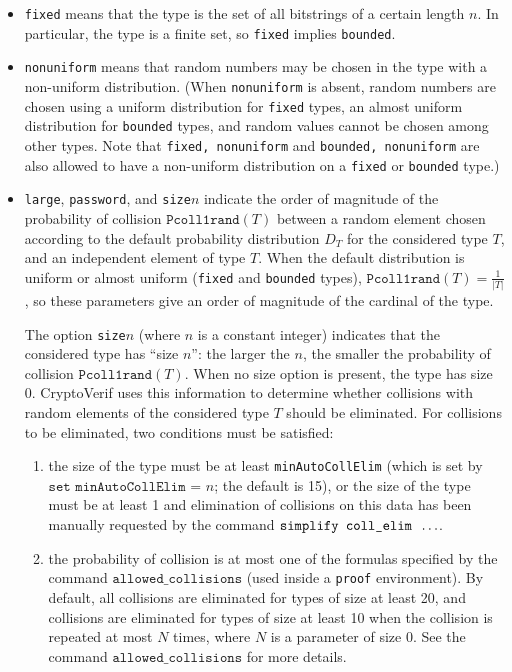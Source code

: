 \begin{itemize}
\begin{itemize}
\item \texttt{fixed} means that the type is the set of all bitstrings of 
a certain length $n$. In particular, the type is a finite set,
so \texttt{fixed} implies \texttt{bounded}. 

\item \texttt{nonuniform} means that random numbers may be chosen in
  the type with a non-uniform distribution. (When \texttt{nonuniform}
  is absent, random numbers are chosen using a uniform distribution
  for {\tt fixed} types, an almost uniform distribution for
  \texttt{bounded} types, and random values cannot be chosen among
  other types. Note that \texttt{fixed, nonuniform} and
  \texttt{bounded, nonuniform} are also allowed to have a non-uniform
  distribution on a \texttt{fixed} or \texttt{bounded} type.)

\item \texttt{large}, \texttt{password}, and \texttt{size$n$} indicate 
the order of magnitude of the probability of collision $\texttt{Pcoll1rand}(T)$
between a random element
chosen according to the default probability distribution $D_T$ for the considered type $T$,
and an independent element of type $T$. When the default distribution is uniform
or almost uniform ({\tt fixed} and {\tt bounded} types), $\texttt{Pcoll1rand}(T) = \frac{1}{|T|}$,
so these parameters give an order of magnitude of the cardinal of the type.

The option \texttt{size$n$} (where $n$ is a constant integer) indicates
that the considered type has ``size $n$'': the larger the $n$, the
smaller the probability of collision $\texttt{Pcoll1rand}(T)$.
When no size option is present, the type has size 0.
CryptoVerif uses this information to determine whether collisions 
with random elements of the considered type $T$ should be eliminated.
For collisions to be eliminated, two conditions must be satisfied:
\begin{enumerate}

\item the size of the type must be at least \texttt{minAutoCollElim}
(which is set by $\texttt{set minAutoCollElim = }n$; the default is 15),
or the size of the type must be at least 1 and elimination of collisions
on this data has been manually requested by the command 
$\texttt{simplify coll\string_elim }\ldots$.

\item the probability of collision is at most one of the formulas
specified by the command $\texttt{allowed\_collisions}$
(used inside a {\tt proof} environment).
By default, all collisions are eliminated for types of size at least 20,
and collisions are eliminated for types of size at least 10 when
the collision is repeated at most $N$ times, where $N$ is a parameter of size 0.
See the command $\texttt{allowed\_collisions}$ for more details.


\end{enumerate}
\end{itemize}
\end{itemize}
